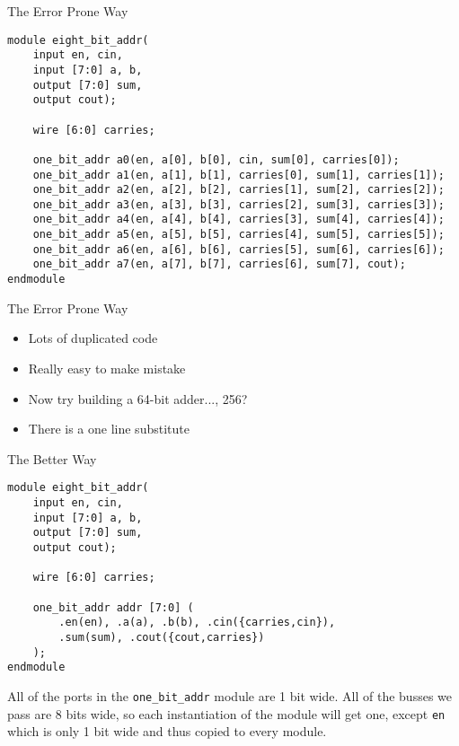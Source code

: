 \documentclass[dvipsnames]{beamer}
\begin{document}
\begin{frame}[fragile]{The Error Prone Way}
\begin{verbatim}
module eight_bit_addr(
    input en, cin,
    input [7:0] a, b,
    output [7:0] sum,
    output cout);

    wire [6:0] carries;

    one_bit_addr a0(en, a[0], b[0], cin, sum[0], carries[0]);
    one_bit_addr a1(en, a[1], b[1], carries[0], sum[1], carries[1]);
    one_bit_addr a2(en, a[2], b[2], carries[1], sum[2], carries[2]);
    one_bit_addr a3(en, a[3], b[3], carries[2], sum[3], carries[3]);
    one_bit_addr a4(en, a[4], b[4], carries[3], sum[4], carries[4]);
    one_bit_addr a5(en, a[5], b[5], carries[4], sum[5], carries[5]);
    one_bit_addr a6(en, a[6], b[6], carries[5], sum[6], carries[6]);
    one_bit_addr a7(en, a[7], b[7], carries[6], sum[7], cout);
endmodule
\end{verbatim}
\end{frame}

\begin{frame}{The Error Prone Way}
	\begin{itemize}
		\item Lots of duplicated code
		\item Really easy to make mistake
		\item Now try building a 64-bit adder..., 256?
		\item There is a one line substitute
	\end{itemize}
\end{frame}

\begin{frame}[fragile]{The Better Way}
\begin{verbatim}
module eight_bit_addr(
    input en, cin,
    input [7:0] a, b,
    output [7:0] sum,
    output cout);

    wire [6:0] carries;

    one_bit_addr addr [7:0] (
        .en(en), .a(a), .b(b), .cin({carries,cin}),
        .sum(sum), .cout({cout,carries})
    );
endmodule
\end{verbatim}

All of the ports in the \texttt{one\_bit\_addr} module are 1 bit wide. All of the
busses we pass are 8 bits wide, so each instantiation of the module will get
one, except \texttt{en} which is only 1 bit wide and thus copied to every module.

\end{frame}
\end{document}
